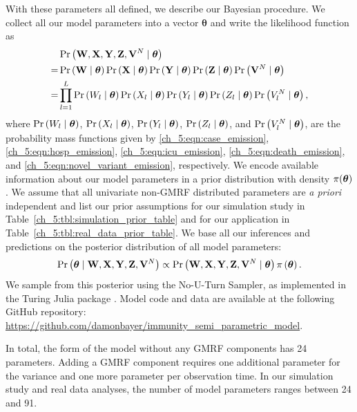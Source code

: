 With these parameters all defined, we describe our Bayesian procedure.
We collect all our model parameters into a vector $\boldsymbol{\theta}$ and write the likelihood function as 
\begin{align*}
& \Pr\left(\mathbf{W}, \mathbf{X}, \mathbf{Y}, \mathbf{Z}, \mathbf{V}^N \mid \boldsymbol{\theta} \right) \\
=& \Pr\left(\mathbf{W} \mid \boldsymbol{\theta} \right) \Pr\left(\mathbf{X} \mid \boldsymbol{\theta} \right) \Pr\left(\mathbf{Y} \mid \boldsymbol{\theta} \right) \Pr\left(\mathbf{Z} \mid \boldsymbol{\theta} \right) \Pr\left(\mathbf{V}^N \mid \boldsymbol{\theta} \right)    \\
=&   \prod_{l=1}^{L} \Pr\left(W_l \mid \boldsymbol{\theta} \right) \Pr\left(X_l \mid \boldsymbol{\theta} \right) \Pr\left(Y_l \mid \boldsymbol{\theta} \right) \Pr\left(Z_l \mid \boldsymbol{\theta} \right) \Pr\left(V^N_l \mid \boldsymbol{\theta} \right) ,
\end{align*}
where \( \Pr\left(W_l \mid \boldsymbol{\theta} \right) \), \( \Pr\left(X_l \mid \boldsymbol{\theta} \right) \), \( \Pr\left(Y_l \mid \boldsymbol{\theta} \right) \), \( \Pr\left(Z_l \mid \boldsymbol{\theta} \right) \), and \( \Pr\left(V^N_l \mid \boldsymbol{\theta} \right) \), are the probability mass functions given by \eqref{ch_5:eqn:case_emission}, \eqref{ch_5:eqn:hosp_emission}, \eqref{ch_5:eqn:icu_emission}, \eqref{ch_5:eqn:death_emission}, and \eqref{ch_5:eqn:novel_variant_emission}, respectively.
We encode available information about our model parameters in a prior distribution with density $\pi(\boldsymbol{\theta})$.
We assume that all univariate non-GMRF distributed parameters are \textit{a priori} independent and list our prior assumptions for our simulation study in Table~\ref{ch_5:tbl:simulation_prior_table} and for our application in Table~\ref{ch_5:tbl:real_data_prior_table}.
We base all our inferences and predictions on the posterior distribution of all model parameters:
\begin{equation}
\Pr\left(\boldsymbol{\theta} \mid \mathbf{W}, \mathbf{X}, \mathbf{Y}, \mathbf{Z}, \mathbf{V}^N \right) \propto \Pr\left(\mathbf{W}, \mathbf{X}, \mathbf{Y}, \mathbf{Z}, \mathbf{V}^N \mid \boldsymbol{\theta} \right) \pi \left( \boldsymbol{\theta} \right).
\end{equation}
We sample from this posterior using the No-U-Turn Sampler, \citep{NUTS} as implemented in the Turing Julia package \citep{turing}.
Model code and data are available at the following GitHub repository: \url{https://github.com/damonbayer/immunity_semi_parametric_model}.

In total, the form of the model without any GMRF components has 24 parameters.
Adding a GMRF component requires one additional parameter for the variance and one more parameter per observation time.
In our simulation study and real data analyses, the number of model parameters ranges between 24 and 91.

